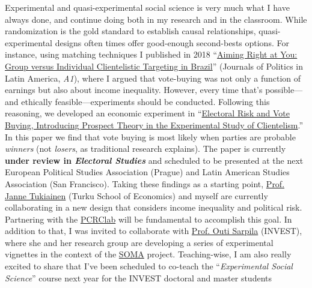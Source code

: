 \documentclass[10pt,stdletter,dateno,sigleft]{newlfm} %
\begin{document}
\begin{newlfm}
Experimental and quasi-experimental social science is very much what I have always done, and continue doing both in my research and in the classroom. While randomization is the gold standard to establish causal relationships, quasi-experimental designs often times offer good-enough second-bests options. For instance, using matching techniques I published in 2018 ``\href{https://journals.sub.uni-hamburg.de/giga/jpla/article/view/1121/1128}{Aiming Right at You: Group versus Individual Clientelistic Targeting in Brazil}'' (Journals of Politics in Latin America, \emph{A1}), where I argued that vote-buying was not only a function of earnings but also about income inequality. However, every time that's possible---and ethically feasible---experiments should be conducted. Following this reasoning, we developed an economic experiment in ``\href{https://github.com/hbahamonde/Economic_Experiment_Vote_Selling/raw/master/Vote_Selling_Bahamonde_Canales_Paper.pdf}{Electoral Risk and Vote Buying, Introducing Prospect Theory in the Experimental Study of Clientelism}.'' In this paper we find that vote buying is most likely when parties are probable \emph{winners} (not \emph{losers}, as traditional research explains). The paper is currently  {\bf under review in \emph{Electoral Studies}} and scheduled to be presented at the next European Political Studies Association (Prague) and Latin American Studies Association (San Francisco). Taking these findings as a starting point, \href{https://www.utu.fi/en/people/janne-tukiainen}{Prof. Janne Tukiainen} (Turku School of Economics) and myself are currently collaborating in a new design that considers income inequality and political risk. Partnering with the \href{https://pcrclab.utu.fi/?page_id=894&lang=en}{PCRClab} will be fundamental to accomplish this goal. In addition to that, I was invited to collaborate with \href{https://www.utu.fi/en/people/outi-sarpila}{Prof. Outi Sarpila} (INVEST), where she and her research group are developing a series of experimental vignettes in the context of the \href{https://soma.utu.fi}{SOMA} project. Teaching-wise, I am also really excited to share that I've been scheduled to co-teach the ``\emph{Experimental Social Science}'' course next year for the INVEST doctoral and master students


\end{newlfm}
\end{document}
